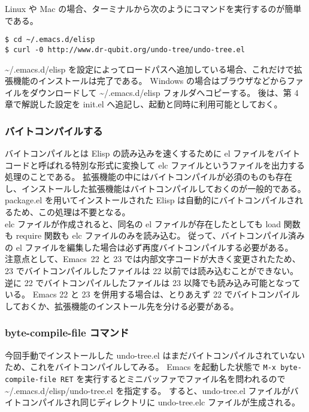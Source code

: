 Linux や Mac の場合、ターミナルから次のようにコマンドを実行するのが簡単である。
\begin{mdframed}[roundcorner=0.50zw,leftmargin=3.00zw,rightmargin=3.00zw,skipabove=0.40zw,skipbelow=0.40zw,innertopmargin=4.00pt,innerbottommargin=4.00pt,innerleftmargin=5.00pt,innerrightmargin=5.00pt,linecolor=gray!090,linewidth=0.50pt,backgroundcolor=gray!90]\color{gray!10}
\begin{verbatim}
$ cd ~/.emacs.d/elisp
$ curl -0 http://www.dr-qubit.org/undo-tree/undo-tree.el
\end{verbatim}
\end{mdframed}
\textasciitilde{}/.emacs.d/elisp を設定によってロードパスへ追加している場合、これだけで拡張機能のインストールは完了である。
Windows の場合はブラウザなどからファイルをダウンロードして \textasciitilde{}/.emacs.d/elisp フォルダへコピーする。
後は、第 4 章で解説した設定を init.el へ追記し、起動と同時に利用可能としておく。
\subsubsection{バイトコンパイルする}
バイトコンパイルとは Elisp の読み込みを速くするために el ファイルをバイトコードと呼ばれる特別な形式に変換して elc ファイルというファイルを出力する処理のことである。
拡張機能の中にはバイトコンパイルが必須のものも存在し、インストールした拡張機能はバイトコンパイルしておくのが一般的である。
package.el を用いてインストールされた Elisp は自動的にバイトコンパイルされるため、この処理は不要となる。\\

elc ファイルが作成されると、同名の el ファイルが存在したとしても load 関数も require 関数も elc ファイルのみを読み込む。
従って、バイトコンパイル済みの el ファイルを編集した場合は必ず再度バイトコンパイルする必要がある。\\

注意点として、Emacs~22 と 23 では内部文字コードが大きく変更されたため、23 でバイトコンパイルしたファイルは 22 以前では読み込むことができない。
逆に 22 でバイトコンパイルしたファイルは 23 以降でも読み込み可能となっている。
Emacs 22 と 23 を併用する場合は、とりあえず 22 でバイトコンパイルしておくか、拡張機能のインストール先を分ける必要がある。
\subsubsection{byte-compile-file コマンド}
今回手動でインストールした undo-tree.el はまだバイトコンパイルされていないため、これをバイトコンパイルしてみる。
Emacs を起動した状態で \texttt{M-x byte-compile-file RET} を実行するとミニバッファでファイル名を問われるので \textasciitilde{}/.emacs.d/elisp/undo-tree.el を指定する。
すると、undo-tree.el ファイルがバイトコンパイルされ同じディレクトリに undo-tree.elc ファイルが生成される。
